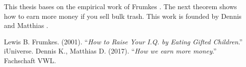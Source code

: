 \documentclass[12pt]{article}
\begin{document}
This thesis bases on the empirical work of Frumkes \cite{brain}. The next theorem shows how to earn more money if you sell bulk trash. This work is founded by Dennis and Matthias \cite{money}.

\begin{thebibliography}{99}
 Lewis B. Frumkes. (2001). ``\textit{How to Raise Your I.Q. by Eating Gifted Children}.'' iUniverse.
 Dennis K., Matthias D. (2017). ``\textit{How we earn more money}.'' Fachschaft VWL.
\end{thebibliography}
\end{document}
